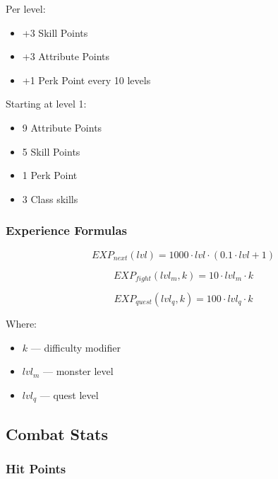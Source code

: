 Per level:

\begin{itemize}
\item +3 Skill Points
\item +3 Attribute Points
\item +1 Perk Point every 10 levels
\end{itemize}

Starting at level 1:

\begin{itemize}
\item 9 Attribute Points
\item 5 Skill Points
\item 1 Perk Point
\item 3 Class skills
\end{itemize}

\subsubsection{Experience Formulas}

\begin{equation}
EXP_{next}(lvl) = 1000 \cdot lvl \cdot (0.1 \cdot lvl + 1)
\end{equation}

\begin{equation}
EXP_{fight}(lvl_m, k) = 10 \cdot lvl_m \cdot k
\end{equation}

\begin{equation}
EXP_{quest}(lvl_q, k) = 100 \cdot lvl_q \cdot k
\end{equation}

Where:

\begin{itemize}
\item $k$ — difficulty modifier
\item $lvl_m$ — monster level
\item $lvl_q$ — quest level
\end{itemize}



\subsection{Combat Stats}

\subsubsection{Hit Points}

